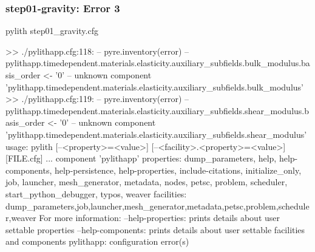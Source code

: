 \documentclass[aspectratio=169]{beamer}
\begin{document}
\begin{frame}[fragile]
  \frametitle{{\ttfamily step01-gravity}: Error 3}

\begin{bashcode}
pylith step01_gravity.cfg

 >> ./pylithapp.cfg:118:
 -- pyre.inventory(error)
 -- pylithapp.timedependent.materials.elasticity.auxiliary_subfields.bulk_modulus.basis_order <- '0'
 -- unknown component 'pylithapp.timedependent.materials.elasticity.auxiliary_subfields.bulk_modulus'
 >> ./pylithapp.cfg:119:
 -- pyre.inventory(error)
 -- pylithapp.timedependent.materials.elasticity.auxiliary_subfields.shear_modulus.basis_order <- '0'
 -- unknown component 'pylithapp.timedependent.materials.elasticity.auxiliary_subfields.shear_modulus'
usage: pylith [--<property>=<value>] [--<facility>.<property>=<value>] [FILE.cfg] ...
component 'pylithapp'
    properties: dump_parameters, help, help-components, help-persistence, help-properties, include-citations, initialize_only, job, launcher, mesh_generator, metadata, nodes, petsc, problem, scheduler, start_python_debugger, typos, weaver
    facilities: dump_parameters,job,launcher,mesh_generator,metadata,petsc,problem,scheduler,weaver
For more information:
  --help-properties: prints details about user settable properties
  --help-components: prints details about user settable facilities and components
pylithapp: configuration error(s)
\end{bashcode}

\end{frame}
\end{document}

